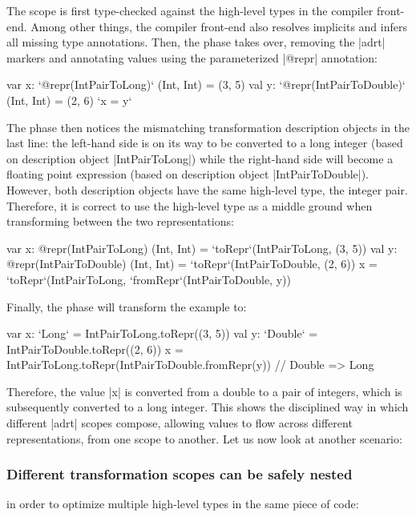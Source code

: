 The scope is first type-checked against the high-level types in the compiler front-end. Among other things, the compiler front-end also resolves implicits and infers all missing type annotations. Then, the  \inject{} phase takes over, removing the |adrt| markers and annotating values using the parameterized |@repr| annotation:

\begin{lstlisting-nobreak}
var x: `@repr(IntPairToLong)` (Int, Int) = (3, 5)
val y: `@repr(IntPairToDouble)` (Int, Int) = (2, 6)
`x = y`
\end{lstlisting-nobreak}

The \coerce{} phase then notices the mismatching transformation description objects in the last line: the left-hand side is on its way to be converted to a long integer (based on description object |IntPairToLong|) while the right-hand side will become a floating point expression (based on description object |IntPairToDouble|). However, both description objects have the same high-level type, the integer pair. Therefore, it is correct to use the high-level type as a middle ground when transforming between the two representations:

\begin{lstlisting-nobreak}
var x: @repr(IntPairToLong) (Int, Int) = `toRepr`(IntPairToLong, (3, 5))
val y: @repr(IntPairToDouble) (Int, Int) = `toRepr`(IntPairToDouble, (2, 6))
x = `toRepr`(IntPairToLong, `fromRepr`(IntPairToDouble, y))
\end{lstlisting-nobreak}

Finally, the \commit{} phase will transform the example to:

\begin{lstlisting-nobreak}
var x: `Long` = IntPairToLong.toRepr((3, 5))
val y: `Double` = IntPairToDouble.toRepr((2, 6))
x = IntPairToLong.toRepr(IntPairToDouble.fromRepr(y)) // Double => Long
\end{lstlisting-nobreak}

Therefore, the value |x| is converted from a double to a pair of integers, which is subsequently converted to a long integer. This shows the disciplined way in which different |adrt| scopes compose, allowing values to flow across different representations, from one scope to another. Let us now look at another scenario:

\subsubsection{Different transformation scopes can be safely nested} in order to optimize multiple high-level types in the same piece of code:

